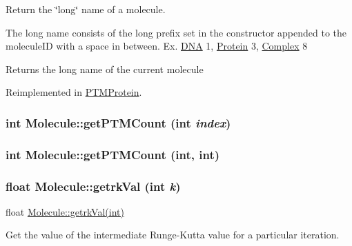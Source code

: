 Return the \char`\"{}long\char`\"{} name of a molecule.

The long name consists of the long prefix set in the constructor appended to the moleculeID with a space in between. Ex. \hyperlink{classDNA}{DNA} 1, \hyperlink{classProtein}{Protein} 3, \hyperlink{classComplex}{Complex} 8

\begin{DoxyReturn}{Returns}
the long name of the current molecule 
\end{DoxyReturn}


Reimplemented in \hyperlink{classPTMProtein_a933492fe6252149290b4a2e9885588da}{PTMProtein}.\hypertarget{classMolecule_a7a8b15817d1f1baafe07b50c29cbbc9d}{
\subsubsection[{getPTMCount}]{\setlength{\rightskip}{0pt plus 5cm}int Molecule::getPTMCount (int {\em index})}}
\label{classMolecule_a7a8b15817d1f1baafe07b50c29cbbc9d}
\hypertarget{classMolecule_ae946ae8bea91c5893ad9bf0fb66b6e0d}{
\subsubsection[{getPTMCount}]{\setlength{\rightskip}{0pt plus 5cm}int Molecule::getPTMCount (int, \/  int)}}
\label{classMolecule_ae946ae8bea91c5893ad9bf0fb66b6e0d}
\hypertarget{classMolecule_a66d5e242462b12c0a742fedec0a6bf78}{
\subsubsection[{getrkVal}]{\setlength{\rightskip}{0pt plus 5cm}float Molecule::getrkVal (int {\em k})}}
\label{classMolecule_a66d5e242462b12c0a742fedec0a6bf78}
float \hyperlink{classMolecule_a66d5e242462b12c0a742fedec0a6bf78}{Molecule::getrkVal(int)}

Get the value of the intermediate Runge-\/Kutta value for a particular iteration.


